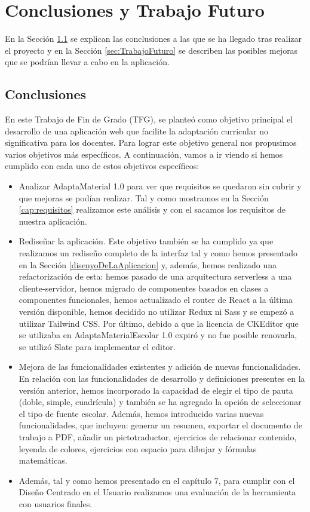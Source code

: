 \chapter{Conclusiones y Trabajo Futuro}
\label{cap:conclusiones}

En la Sección \ref{sec:conclusiones} se explican las conclusiones a las que se ha llegado tras realizar el proyecto y en la Sección \ref{sec:TrabajoFuturo} se describen las posibles mejoras que se podrían llevar a cabo en la aplicación.

\section{Conclusiones}
\label{sec:conclusiones}
En este Trabajo de Fin de Grado (TFG), se planteó como objetivo principal el desarrollo de una aplicación web que facilite la adaptación curricular no significativa para los docentes. Para lograr este objetivo general nos propusimos varios objetivos más específicos. A continuación, vamos a ir viendo si hemos cumplido con cada uno de estos objetivos específicos:

\begin{itemize}
    \item Analizar AdaptaMaterial 1.0 para ver que requisitos se quedaron sin cubrir y que mejoras se podían realizar. Tal y como mostramos en la Sección \ref{cap:requisitos} realizamos este análisis y con el sacamos los requisitos de nuestra aplicación.
    \item Rediseñar la aplicación. Este objetivo también se ha cumplido ya que realizamos un rediseño completo de la interfaz tal y como hemos presentado en la Sección \ref{disenyoDeLaAplicacion} y, además, hemos realizado una refactorización de esta: hemos pasado de una arquitectura serverless a una cliente-servidor, hemos migrado de componentes basados en clases a componentes funcionales, hemos actualizado el router de React a la última versión disponible, hemos decidido no utilizar Redux ni Sass y se empezó a utilizar Tailwind CSS. Por último, debido a que la licencia de CKEditor que se utilizaba en AdaptaMaterialEscolar 1.0 expiró y no fue posible renovarla, se utilizó Slate para implementar el editor.
    \item Mejora de las funcionalidades existentes y adición de nuevas funcionalidades. En relación con las funcionalidades de desarrollo y definiciones presentes en la versión anterior, hemos incorporado la capacidad de elegir el tipo de pauta (doble, simple, cuadrícula) y también se ha agregado la opción de seleccionar el tipo de fuente escolar. Además, hemos introducido varias nuevas funcionalidades, que incluyen: generar un resumen, exportar el documento de trabajo a PDF, añadir un pictotraductor, ejercicios de relacionar contenido, leyenda de colores, ejercicios con espacio para dibujar y fórmulas matemáticas.
    \item Además, tal y como hemos presentado en el capítulo 7, para cumplir con el Diseño Centrado en el Usuario realizamos una evaluación de la herramienta con usuarios finales.
\end{itemize}

